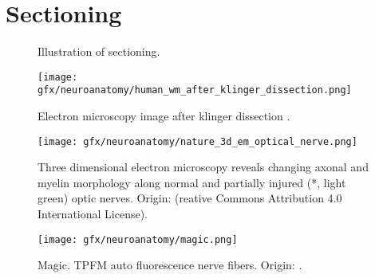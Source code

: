 \section{Sectioning}
%
\begin{figure}[!t]
	\centering
    \def\tikzwidth{0.75\textwidth}
	\caption{Illustration of sectioning.}
	\label{fig:brain_sectioning}
\end{figure}
% 
\begin{figure}[!t]
	\centering
	\texttt{[image: gfx/neuroanatomy/human\_wm\_after\_klinger\_dissection.png]}
	\caption{Electron microscopy image after klinger dissection \cite{destrieux:hal-01261930}.}
\end{figure}
% 
\begin{figure}[!t]
	\centering
	 \texttt{[image: gfx/neuroanatomy/nature\_3d\_em\_optical\_nerve.png]}
	\caption{ Three dimensional electron microscopy reveals changing axonal and myelin morphology along normal and partially injured (*, light green) optic nerves. Origin: \cite{Giacci2018} (reative Commons Attribution 4.0 International License).}
\end{figure}
%
% 
\begin{figure}[!t]
	\centering
	\texttt{[image: gfx/neuroanatomy/magic.png]}
	\caption{Magic. TPFM auto fluorescence nerve fibers. Origin: \cite{Costantini2020}.}
\end{figure}
% 
